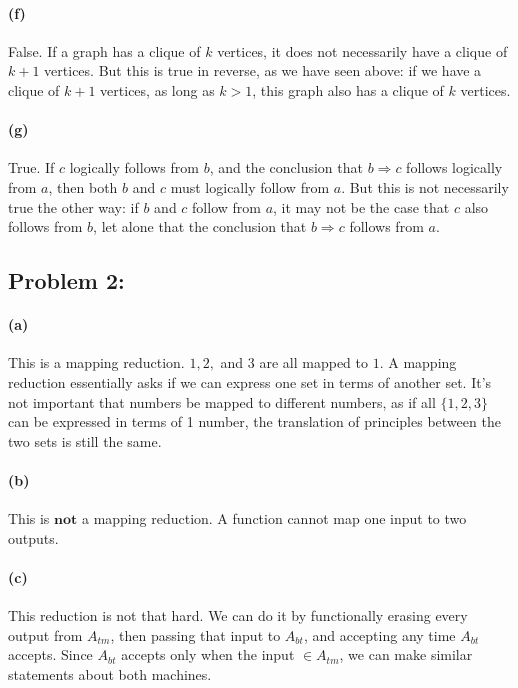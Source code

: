 \documentclass[a4paper]{article}
\begin{document}
\paragraph{(f)} False. If a graph has a clique of $k$ vertices, it does not necessarily have a clique of $k+1$ vertices. But this is true in reverse, as we have seen above: if we have a clique of $k+1$ vertices, as long as $k>1$, this graph also has a clique of $k$ vertices.

\paragraph{(g)} True. If $c$ logically follows from $b$, and the conclusion that $b \Rightarrow c$ follows logically from $a$, then both $b$ and $c$ must logically follow from $a$. But this is not necessarily true the other way: if $b$ and $c$ follow from $a$, it may not be the case that $c$ also follows from $b$, let alone that the conclusion that $b \Rightarrow c$ follows from $a$.

\subsection*{Problem 2:}

\paragraph{(a)} This is a mapping reduction. $1,2,$ and $3$ are all mapped to $1$. A mapping reduction essentially asks if we can express one set in terms of another set. It's not important that numbers be mapped to different numbers, as if all $\{1,2,3\}$ can be expressed in terms of 1 number, the translation of principles between the two sets is still the same.

\paragraph{(b)} This is $\textbf{not}$ a mapping reduction. A function cannot map one input to two outputs.

\paragraph{(c)} This reduction is not that hard. We can do it by functionally erasing every output from $A_{tm}$, then passing that input to $A_{bt}$, and accepting any time $A_{bt}$ accepts. Since $A_{bt}$ accepts only when the input $\in A_{tm}$, we can make similar statements about both machines.
\end{document}
